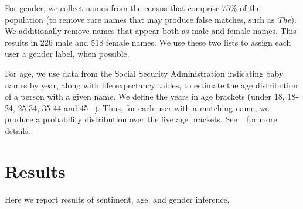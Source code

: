 \documentclass{sig-alternate}
\newcommand{\citenoun}[1]{{\citeauthor{#1}~\cite{#1}}}
\begin{document}
For gender, we collect names from the census that comprise 75\% of the
population (to remove rare names that may produce false matches, such as {\it
  The}). We additionally remove names that appear both as male and female
names. This results in 226 male and 518 female names. We use these two lists to assign each user a gender label, when possible.

For age, we use data from the Social Security Administration indicating baby names by year, along with life expectancy tables, to estimate the age distribution of a person with a given name. We define the years in age brackets (under 18, 18-24, 25-34, 35-44 and 45+). Thus, for each user with a matching name, we produce a probability distribution over the five age brackets. See \citenoun{silver2014how} for more details.

\section{Results}
\label{s.results}

Here we report results of sentiment, age, and gender inference.
\end{document}
